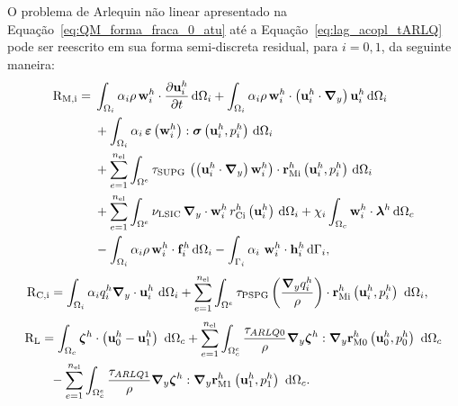 O problema de Arlequin não linear apresentado na Equação~\eqref{eq:QM_forma_fraca_0_atu} até a Equação~\eqref{eq:lag_acopl_tARLQ} pode ser reescrito em sua forma semi-discreta residual, para $i=0,1$, da seguinte maneira:
\begin{align}
	\begin{split}
		\mathrm{R}_\mathrm{M,i} =\; & \int_{\Omega_i} \alpha_i \rho\, \mathbf{w}_i^h \cdot \frac{\partial\mathbf{u}_i^{h}}{\partial t} \, \mathrm{d} \Omega_i 
		+ \int_{\Omega_i} \alpha_i \rho\, \mathbf{w}_i^h \cdot \left( \mathbf{u}_i^{h} \cdot \boldsymbol{\nabla}_y \right)\mathbf{u}_i^{h} \, \mathrm{d} \Omega_i  \\ 
		&+ \int_{\Omega_i} \alpha_i\, \bm{\varepsilon} \left(\mathbf{w}_i^h\right) : \boldsymbol{\sigma} \left(\mathbf{u}_i^{h},p_i^{h}\right) \, \mathrm{d} \Omega_i 
		\\ 
		&+ \sum_{e=1}^{n_{\mathrm{el}}} \int_{\Omega^e} \tau_{\mathrm{SUPG}}\, \left( \left( \mathbf{u}_i^{h} \cdot \boldsymbol{\nabla}_y \right)\mathbf{w}_i^h \right) \cdot \mathbf{r}_{\mathrm{Mi}}^{h} \left(\mathbf{u}_i^{h},p_i^{h} \right) \, \mathrm{d} \Omega_i \\ 
		&+ \sum_{e=1}^{n_{\mathrm{el}}} \int_{\Omega^e} \nu_{\mathrm{LSIC}}\, \boldsymbol{\nabla}_y \cdot \mathbf{w}_i^h\, r_{\mathrm{Ci}}^{h} \left(\mathbf{u}_i^{h}\right) \, \mathrm{d} \Omega_i 
		+ \chi_{i} \int_{\Omega_c} \mathbf{w}_i^h \cdot \boldsymbol{\lambda}^{h} \, \mathrm{d} \Omega_c \\
		&- \int_{\Omega_i} \alpha_i \rho\, \mathbf{w}_i^h \cdot \mathbf{f}_i^h \, \mathrm{d} \Omega_i 
		- \int_{\Gamma_i} \alpha_i\ \mathbf{w}_i^h \cdot \mathbf{h}_i^h \, \mathrm{d} \Gamma_i,
	\end{split}
\end{align}
\begin{align}
	\begin{split}
		&\mathrm{R}_\mathrm{C,i} = \int_{\Omega_i} \alpha_i q_i^h \boldsymbol{\nabla}_y \cdot \mathbf{u}_i^{h} \ \mathrm{d} \Omega_i +
		\sum_{e=1}^{n_{\mathrm{el}}} \int_{\Omega^e} \tau_{\mathrm{PSPG}} \left(\frac{\boldsymbol{\nabla}_y q_i^h }{\rho}\right) \cdot \mathbf{r}_{\mathrm{Mi}}^{h} \left(\mathbf{u}_i^{h},p_i^{h} \right) \  \mathrm{d} \Omega_i,
	\end{split}
\end{align}
\begin{align}
	\begin{split}
		&\mathrm{R}_\mathrm{L} = \int_{\Omega_c}  \boldsymbol{\zeta}^h  \cdot \left(\mathbf{u}_0^h - \mathbf{u}_1^h \right) \ \mathrm{d} \Omega_c + \sum_{e=1}^{n_{\mathrm{el}}} \int_{\Omega^e_{c}} \frac{\tau_{ARLQ0}}{\rho} \boldsymbol{\nabla}_y \boldsymbol{\zeta}^h : \boldsymbol{\nabla}_y \mathbf{r}_{\mathrm{M0}}^{h}\left(\mathbf{u}_0^h,p_0^h\right) \ \mathrm{d} \Omega_c\\
		&\qquad - \sum_{e=1}^{n_{\mathrm{el}}} \int_{\Omega^e_{c}} \frac{\tau_{ARLQ1}}{\rho} \boldsymbol{\nabla}_y \boldsymbol{\zeta}^h : \boldsymbol{\nabla}_y \mathbf{r}_{\mathrm{M1}}^{h}\left(\mathbf{u}_1^h,p_1^h\right) \ \mathrm{d} \Omega_c.
	\end{split}
\end{align}

